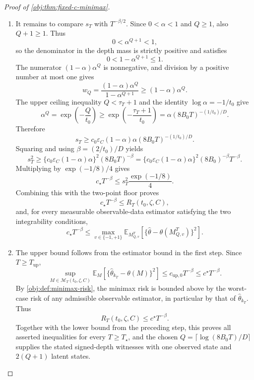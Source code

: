 \begin{proof}[Proof of \cref{obj:thm:fixed-c-minimax}]
\begin{enumerate}
\item It remains to compare \(s_T\) with \(T^{-\beta/2}\). Since \(0<\alpha<1\) and \(Q\ge1\), also \(Q+1\ge1\). Thus
\[
0<\alpha^{Q+1}<1,
\]
so the denominator in the depth mass is strictly positive and satisfies
\[
0<1-\alpha^{Q+1}\le1.
\]
The numerator \((1-\alpha)\alpha^Q\) is nonnegative, and division by a positive number at most one gives
\[
w_Q
=
\frac{(1-\alpha)\alpha^Q}{1-\alpha^{Q+1}}
\ge
(1-\alpha)\alpha^Q .
\]
The upper ceiling inequality \(Q<\tau_T+1\) and the identity \(\log\alpha=-1/t_0\) give
\[
\alpha^Q
=
\exp\!\left(-\frac{Q}{t_0}\right)
\ge
\exp\!\left(-\frac{\tau_T+1}{t_0}\right)
=
\alpha(8B_0T)^{-(1/t_0)/D}.
\]
Therefore
\[
s_T
\ge
c_0\varepsilon_C(1-\alpha)\alpha
(8B_0T)^{-(1/t_0)/D}.
\]
Squaring and using \(\beta=(2/t_0)/D\) yields
\[
s_T^2
\ge
\{c_0\varepsilon_C(1-\alpha)\alpha\}^2
(8B_0T)^{-\beta}
=
\{c_0\varepsilon_C(1-\alpha)\alpha\}^2
(8B_0)^{-\beta}T^{-\beta}.
\]
Multiplying by \(\exp(-1/8)/4\) gives
\[
c_\star T^{-\beta}
\le
s_T^2\frac{\exp(-1/8)}{4}.
\]
Combining this with the two-point floor proves
\[
c_\star T^{-\beta}
\le
R_T(t_0,\zeta,C),
\]
and, for every measurable observable-data estimator satisfying the two integrability conditions,
\[
c_\star T^{-\beta}
\le
\max_{v\in\{-1,+1\}}
\mathbb E_{M_{Q,v}^T}\!\left[
\{\widehat\theta-\theta(M_{Q,v}^T)\}^2
\right].
\] %

\item The upper bound follows from the estimator bound in the first step. Since \(T\ge T_{\mathrm{up}}\),
\[
\sup_{M\in\mathcal M_T(t_0,\zeta,C)}
\mathbb E_M\!\left[
\{\widehat\theta_{k_T}-\theta(M)\}^2
\right]
\le
c_{\mathrm{up},0}T^{-\beta}
\le
c^\star T^{-\beta}.
\]
By \cref{obj:def:minimax-risk}, the minimax risk is bounded above by the worst-case risk of any admissible observable estimator, in particular by that of \(\widehat\theta_{k_T}\). Thus
\[
R_T(t_0,\zeta,C)
\le
c^\star T^{-\beta}.
\]
Together with the lower bound from the preceding step, this proves all asserted inequalities for every \(T\ge T_\star\), and the chosen \(Q=\lceil \log(8B_0T)/D\rceil\) supplies the stated signed-depth witnesses with one observed state and \(2(Q+1)\) latent states. %
\end{enumerate}
\end{proof}

